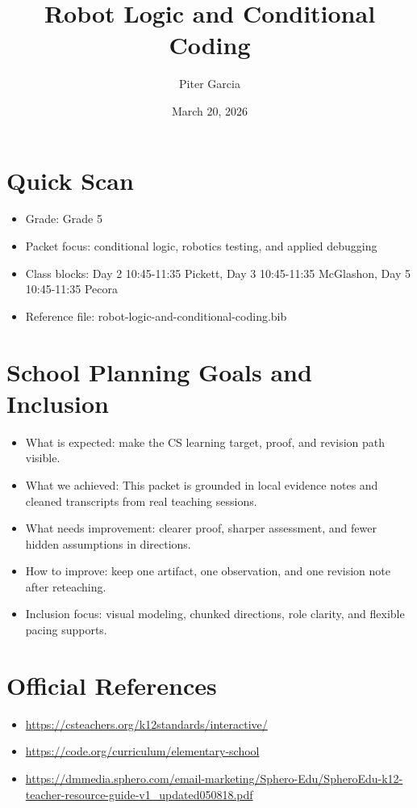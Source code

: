 \documentclass[11pt]{article}
\title{Robot Logic and Conditional Coding}
\author{Piter Garcia}
\date{March 20, 2026}
\begin{document}
\maketitle
\section*{Quick Scan}
\begin{itemize}[leftmargin=*]
\item Grade: Grade 5
\item Packet focus: conditional logic, robotics testing, and applied debugging
\item Class blocks: Day 2 10:45-11:35 Pickett, Day 3 10:45-11:35 McGlashon, Day 5 10:45-11:35 Pecora
\item Reference file: robot-logic-and-conditional-coding.bib
\end{itemize}
\section*{School Planning Goals and Inclusion}
\begin{itemize}[leftmargin=*]
\item What is expected: make the CS learning target, proof, and revision path visible.
\item What we achieved: This packet is grounded in local evidence notes and cleaned transcripts from real teaching sessions.
\item What needs improvement: clearer proof, sharper assessment, and fewer hidden assumptions in directions.
\item How to improve: keep one artifact, one observation, and one revision note after reteaching.
\item Inclusion focus: visual modeling, chunked directions, role clarity, and flexible pacing supports.
\end{itemize}
\section*{Official References}
\begin{itemize}[leftmargin=*]
\item \url{https://csteachers.org/k12standards/interactive/}
\item \url{https://code.org/curriculum/elementary-school}
\item \url{https://dmmedia.sphero.com/email-marketing/Sphero-Edu/SpheroEdu-k12-teacher-resource-guide-v1_updated050818.pdf}
\end{itemize}
\end{document}
